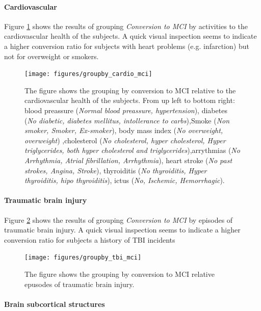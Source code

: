 \documentclass[11pt]{article}
\theoremstyle{definition}
\theoremstyle{remark}
\begin{document}
\paragraph*{Cardiovascular}
Figure \ref{fig:groupby_cardio_mci} shows the results of grouping \emph{Conversion to MCI} by activities to the cardiovascular health of the subjects. A quick visual inspection seems to indicate a higher conversion ratio for subjects with heart problems (e.g. infarction) but not for overweight or smokers.

\begin{figure}[H]
        \centering
        \texttt{[image: figures/groupby\_cardio\_mci]}
        \caption{The figure shows the grouping by conversion to MCI relative to the cardiovascular health of the subjects. From up left to bottom right: blood preassure (\emph{Normal blood preassure, hypertension}), diabetes (\emph{No diabetic, diabetes mellitus, intollerance to carbs}),Smoke (\emph{Non smoker, Smoker, Ex-smoker}), body mass index (\emph{No overweight, overweight}) ,cholesterol (\emph{No cholesterol, hyper cholesterol, Hyper triglycerides, both hyper cholesterol and triglycerides}),arrythmias (\emph{No Arrhythmia, Atrial fibrillation, Arrhythmia}), heart stroke (\emph{No past strokes, Angina, Stroke}), thyroiditis (\emph{No thyroiditis, Hyper thyroiditis, hipo thyroiditis}), ictus (\emph{No, Ischemic, Hemorrhagic}).}
        \label{fig:groupby_cardio_mci}
\end{figure}


\paragraph*{Traumatic brain injury}
Figure \ref{fig:groupby_tbi_mci} shows the results of grouping \emph{Conversion to MCI} by episodes of traumatic brain injury. A quick visual inspection seems to indicate a higher conversion ratio for subjects a history of TBI incidents

\begin{figure}[H]
        \centering
        \texttt{[image: figures/groupby\_tbi\_mci]}
        \caption{The figure shows the grouping by conversion to MCI relative epusodes of traumatic brain injury.}
        \label{fig:groupby_tbi_mci}
\end{figure}

\paragraph{Brain subcortical structures}
\end{document}
